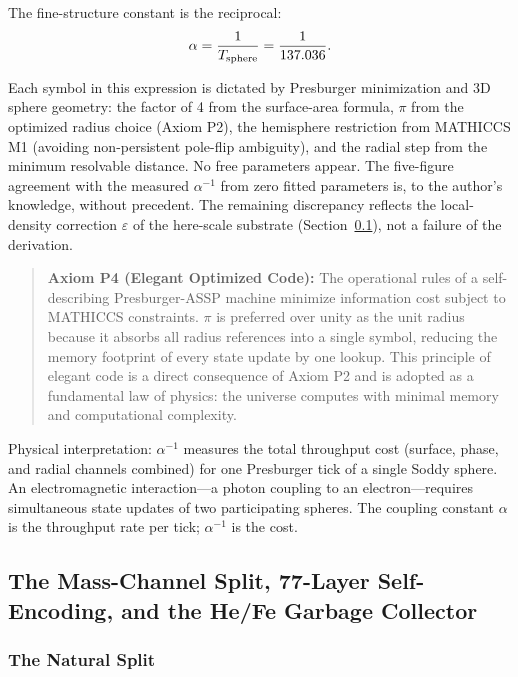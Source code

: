 \documentclass[11pt,a4paper]{article}
\begin{document}
The fine-structure constant is the reciprocal:
\[
\alpha = \frac{1}{T_{\rm sphere}} = \frac{1}{137.036}.
\]

Each symbol in this expression is dictated by Presburger minimization and 3D sphere geometry: the factor of 4 from the surface-area formula, $\pi$ from the optimized radius choice (Axiom P2), the hemisphere restriction from MATHICCS M1 (avoiding non-persistent pole-flip ambiguity), and the radial step from the minimum resolvable distance. No free parameters appear. The five-figure agreement with the measured $\alpha^{-1}$ from zero fitted parameters is, to the author's knowledge, without precedent. The remaining discrepancy reflects the local-density correction $\varepsilon$ of the here-scale substrate (Section~\ref{sec:mass_channel}), not a failure of the derivation.

\begin{quote}
\textbf{Axiom P4 (Elegant Optimized Code):} The operational rules of a self-describing Presburger-ASSP machine minimize information cost subject to MATHICCS constraints. $\pi$ is preferred over unity as the unit radius because it absorbs all radius references into a single symbol, reducing the memory footprint of every state update by one lookup. This principle of elegant code is a direct consequence of Axiom P2 and is adopted as a fundamental law of physics: the universe computes with minimal memory and computational complexity.
\end{quote}

Physical interpretation: $\alpha^{-1}$ measures the total throughput cost (surface, phase, and radial channels combined) for one Presburger tick of a single Soddy sphere. An electromagnetic interaction---a photon coupling to an electron---requires simultaneous state updates of two participating spheres. The coupling constant $\alpha$ is the throughput rate per tick; $\alpha^{-1}$ is the cost.

\subsection{The Mass-Channel Split, 77-Layer Self-Encoding, and the He/Fe Garbage Collector}
\label{sec:mass_channel}

\subsubsection{The Natural Split}
\end{document}
